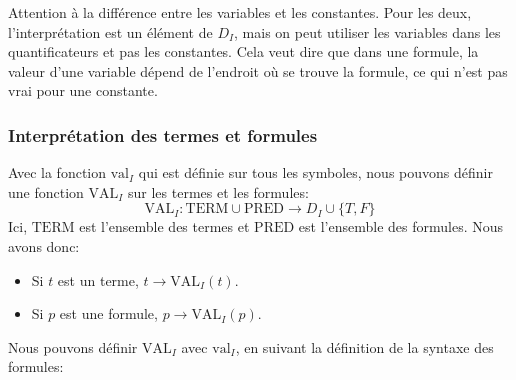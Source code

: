 Attention à la différence entre les variables et les constantes.
Pour les deux, l'interprétation est un élément de $D_I$,
mais on peut utiliser les variables dans les quantificateurs et pas les constantes.
Cela veut dire que dans une formule, la valeur d'une variable dépend de l'endroit où se trouve la formule,
ce qui n'est pas vrai pour une constante.

\subsubsection{Interprétation des termes et formules}

Avec la fonction $\mathrm{val}_I$ qui est définie sur tous les symboles, nous pouvons définir une fonction
$\mathrm{VAL}_I$ sur les termes et les formules:
\begin{equation}
\mathrm{VAL}_I : \mathrm{TERM} \cup \mathrm{PRED} \rightarrow D_I \cup \{T, F\}
\end{equation}
Ici, $\mathrm{TERM}$ est l'ensemble des termes et $\mathrm{PRED}$ est l'ensemble des formules.
Nous avons donc:
\begin{itemize}
\item Si $t$ est un terme, $t \rightarrow \mathrm{VAL}_I(t)$.
\item Si $p$ est une formule, $p \rightarrow \mathrm{VAL}_I(p)$.
\end{itemize}
Nous pouvons définir $\mathrm{VAL}_I$ avec $\mathrm{val}_I$, en suivant la définition de la syntaxe des formules:
